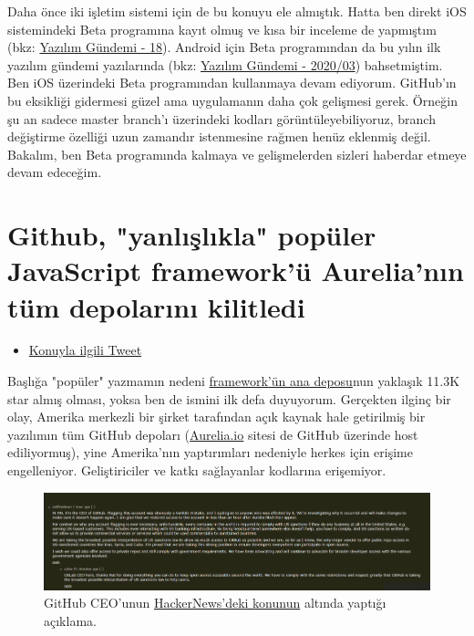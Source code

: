 \documentclass[11pt]{article}
\begin{document}
Daha önce iki işletim sistemi için de bu konuyu ele almıştık. Hatta ben direkt
iOS sistemindeki Beta programına kayıt olmuş ve kısa bir inceleme de yapmıştım
(bkz: \href{../../2019/18/yazilim-gundemi-18.pdf}{Yazılım Gündemi - 18}). Android için Beta programından da bu yılın ilk
yazılım gündemi yazılarında (bkz: \href{../03/yazilim-gundemi-03.pdf}{Yazılım Gündemi - 2020/03}) bahsetmiştim. Ben
iOS üzerindeki Beta programından kullanmaya devam ediyorum. GitHub'ın bu
eksikliği gidermesi güzel ama uygulamanın daha çok gelişmesi gerek. Örneğin şu
an sadece master branch'ı üzerindeki kodları görüntüleyebiliyoruz, branch
değiştirme özelliği uzun zamandır istenmesine rağmen henüz eklenmiş değil.
Bakalım, ben Beta programında kalmaya ve gelişmelerden sizleri haberdar etmeye
devam edeceğim.
\section{Github, "yanlışlıkla" popüler JavaScript framework'ü Aurelia'nın tüm depolarını kilitledi}
\label{sec:orgd41fcb6}
\begin{itemize}
\item \href{https://twitter.com/eisenbergeffect/status/1240671036292485121}{Konuyla ilgili Tweet}
\end{itemize}

Başlığa "popüler" yazmamın nedeni \href{https://github.com/aurelia/framework}{framework'ün ana deposu}nun yaklaşık 11.3K
star almış olması, yoksa ben de ismini ilk defa duyuyorum. Gerçekten ilginç
bir olay, Amerika merkezli bir şirket tarafından açık kaynak hale getirilmiş
bir yazılımın tüm GitHub depoları (\href{https://aurelia.io/}{Aurelia.io} sitesi de GitHub üzerinde host
ediliyormuş), yine Amerika'nın yaptırımları nedeniyle herkes için erişime
engelleniyor. Geliştiriciler ve katkı sağlayanlar kodlarına erişemiyor.

\begin{figure}[htbp]
\centering
\includegraphics[width=.9\linewidth]{gorseller/github-ceo-hackernews.png}
\caption{GitHub CEO'unun \href{https://news.ycombinator.com/item?id=22628961}{HackerNews'deki konunun} altında yaptığı açıklama.}
\end{figure}
\end{document}
